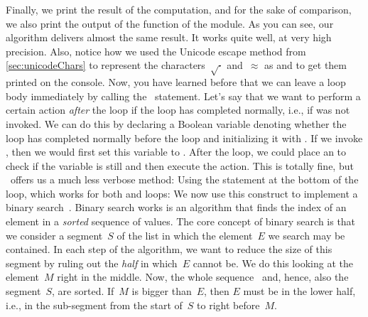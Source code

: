 Finally, we print the result of the computation, and for the sake of comparison, we also print the output of the  function of the  module.
As you can see, our algorithm delivers almost the same result.
It works quite well, at very high precision.
Also, notice how we used the Unicode escape method from \cref{sec:unicodeChars} to represent the characters~$\sqrt{\cdot}$ and~$\approx$ as  and  to get them printed on the console.%
%
\FloatBarrier%
\endhsection%
%
%
%
\label{sec:loopElse}%
%
Now, you have learned before that we can leave a loop body immediately by calling the~ statement.
Let's say that we want to perform a certain action \emph{after} the loop if the loop has completed normally, i.e., if  was not invoked.
We can do this by declaring a Boolean variable denoting whether the loop has completed normally before the loop and initializing it with .
If we invoke , then we would first set this variable to .
After the loop, we could place an  to check if the variable is still  and then execute the action.
This is totally fine, but \python\ offers us a much less verbose method:
Using the  statement at the bottom of the loop, which works for both  and  loops:%
%
%
%
%
%
%
%
We now use this construct to implement a binary search~\cite{K1998SAS,H2024POIC:BS,B1999PP}.
Binary search works is an algorithm that finds the index of an element in a \emph{sorted} sequence  of values.
The core concept of binary search is that we consider a segment~$S$ of the list in which the element~$E$ we search may be contained.
In each step of the algorithm, we want to reduce the size of this segment by ruling out the \emph{half} in which~$E$ cannot be.
We do this looking at the element~$M$ right in the middle.
Now, the whole sequence~ and, hence, also the segment~$S$, are sorted.
If~$M$ is bigger than~$E$, then $E$ must be in the lower half, i.e., in the sub-segment from the start of~$S$ to right before~$M$.
